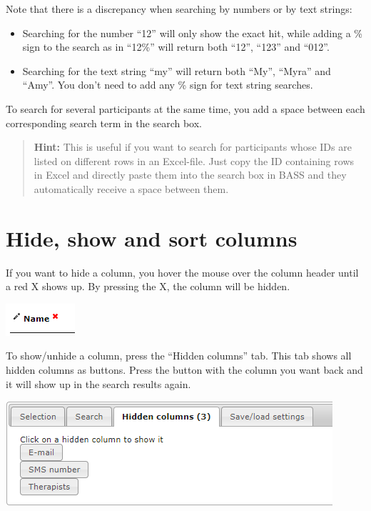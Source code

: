 \documentclass[]{book}
\begin{document}
Note that there is a discrepancy when searching by numbers or by text strings:

\begin{itemize}
\item
  Searching for the number ``12'' will only show the exact hit, while adding a \% sign to the search as in ``12\%'' will return both ``12'', ``123'' and ``012''.
\item
  Searching for the text string ``my'' will return both ``My'', ``Myra'' and ``Amy''. You don't need to add any \% sign for text string searches.
\end{itemize}

To search for several participants at the same time, you add a space between each corresponding search term in the search box.

\begin{quote}
\textbf{Hint:} This is useful if you want to search for participants whose IDs are listed on different rows in an Excel-file. Just copy the ID containing rows in Excel and directly paste them into the search box in BASS and they automatically receive a space between them.
\end{quote}

\hypertarget{hide-show-and-sort-columns}{%
\section{Hide, show and sort columns}\label{hide-show-and-sort-columns}}

If you want to hide a column, you hover the mouse over the column header until a red X shows up. By pressing the X, the column will be hidden.

\includegraphics{images/hide-show-sort.png}

To show/unhide a column, press the ``Hidden columns'' tab. This tab shows all hidden columns as buttons. Press the button with the column you want back and it will show up in the search results again.

\includegraphics{images/hidden-columns.png}
\end{document}
